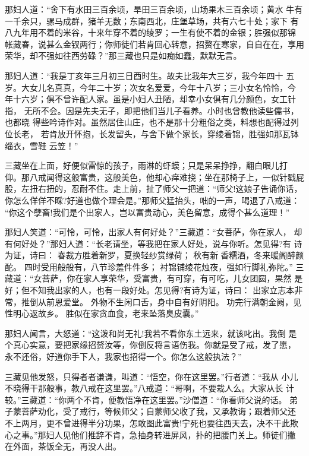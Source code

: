 那妇人道：“舍下有水田三百余顷，旱田三百余顷，山场果木三百余顷；黄水
牛有一千余只，骡马成群，猪羊无数；东南西北，庄堡草场，共有六七十处；家下
有八九年用不着的米谷，十来年穿不着的绫罗；一生有使不着的金银；胜强似那锦
帐藏春，说甚么金钗两行；你师徒们若肯回心转意，招赘在寒家，自自在在，享用
荣华，却不强如往西劳碌？”那三藏也只是如痴如蠢，默默无言。

那妇人道：“我是丁亥年三月初三日酉时生。故夫比我年大三岁，我今年四十
五岁。大女儿名真真，今年二十岁；次女名爱爱，今年十八岁；三小女名怜怜，今
年十六岁；俱不曾许配人家。虽是小妇人丑陋，却幸小女俱有几分颜色，女工针指，
无所不会。因是先夫无子，即把他们当儿子看养。小时也曾教他读些儒书，也都晓
得些吟诗作对。虽然居住山庄，也不是那十分粗俗之类，料想也配得过列位长老，
若肯放开怀抱，长发留头，与舍下做个家长，穿绫着锦，胜强如那瓦钵缁衣，雪鞋
云笠！”

三藏坐在上面，好便似雷惊的孩子，雨淋的虾蟆；只是呆呆挣挣，翻白眼儿打
仰。那八戒闻得这般富贵，这般美色，他却心痒难挠；坐在那椅子上，一似针戳屁
股，左扭右扭的，忍耐不住。走上前，扯了师父一把道：“师父!这娘子告诵你话，
你怎么佯佯不睬?好道也做个理会是。”那师父猛抬头，咄的一声，喝退了八戒道：
“你这个孽畜!我们是个出家人，岂以富贵动心，美色留意，成得个甚么道理！”

那妇人笑道：“可怜，可怜，出家人有何好处？”三藏道：“女菩萨，你在家人，
却有何好处？”那妇人道：“长老请坐，等我把在家人好处，说与你听。怎见得?有
诗为证，诗曰：
春裁方胜着新罗，夏换轻纱赏绿荷；
秋有新香糯酒，冬来暖阁醉颜酡。
四时受用般般有，八节珍羞件件多；
衬锦铺绫花烛夜，强如行脚礼弥陀。”
三藏道：“女菩萨，你在家人享荣华，受富贵，有可穿，有可吃，儿女团圆，果然
是好；但不知我出家的人，也有一段好处。怎见得?有诗为证，诗曰：
出家立志本非常，推倒从前恩爱堂。
外物不生闲口舌，身中自有好阴阳。
功完行满朝金阙，见性明心返故乡。
胜似在家贪血食，老来坠落臭皮囊。”

那妇人闻言，大怒道：“这泼和尚无礼!我若不看你东土远来，就该叱出。我倒
是个真心实意，要把家缘招赘汝等，你倒反将言语伤我。你就是受了戒，发了愿，
永不还俗，好道你手下人，我家也招得一个。你怎么这般执法？”

三藏见他发怒，只得者者谦谦，叫道：“悟空，你在这里罢。”行者道：“我从
小儿不晓得干那般事，教八戒在这里罢。”八戒道：“哥啊，不要栽人么。大家从长
计较。”三藏道：“你两个不肯，便教悟净在这里罢。”沙僧道：“你看师父说的话。
弟子蒙菩萨劝化，受了戒行，等候师父；自蒙师父收了我，又承教诲；跟着师父还
不上两月，更不曾进得半分功果，怎敢图此富贵!宁死也要往西天去，决不干此欺
心之事。”那妇人见他们推辞不肯，急抽身转进屏风，扑的把腰门关上。师徒们撇
在外面，茶饭全无，再没人出。

